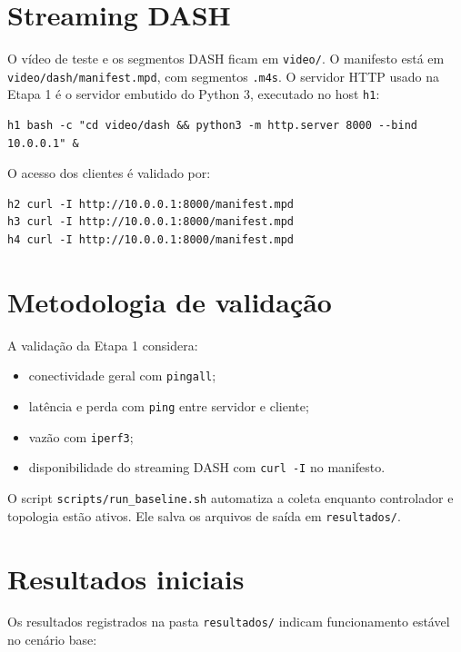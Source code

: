 \documentclass[12pt,a4paper]{article}
\begin{document}
\section{Streaming DASH}

O vídeo de teste e os segmentos DASH ficam em \texttt{video/}. O manifesto está em \texttt{video/dash/manifest.mpd}, com segmentos \texttt{.m4s}. O servidor HTTP usado na Etapa 1 é o servidor embutido do Python 3, executado no host \texttt{h1}:

\begin{verbatim}
h1 bash -c "cd video/dash && python3 -m http.server 8000 --bind 10.0.0.1" &
\end{verbatim}

O acesso dos clientes é validado por:

\begin{verbatim}
h2 curl -I http://10.0.0.1:8000/manifest.mpd
h3 curl -I http://10.0.0.1:8000/manifest.mpd
h4 curl -I http://10.0.0.1:8000/manifest.mpd
\end{verbatim}

\section{Metodologia de validação}

A validação da Etapa 1 considera:

\begin{itemize}
    \item conectividade geral com \texttt{pingall};
    \item latência e perda com \texttt{ping} entre servidor e cliente;
    \item vazão com \texttt{iperf3};
    \item disponibilidade do streaming DASH com \texttt{curl -I} no manifesto.
\end{itemize}

O script \texttt{scripts/run\_baseline.sh} automatiza a coleta enquanto controlador e topologia estão ativos. Ele salva os arquivos de saída em \texttt{resultados/}.

\section{Resultados iniciais}

Os resultados registrados na pasta \texttt{resultados/} indicam funcionamento estável no cenário base:
\end{document}

